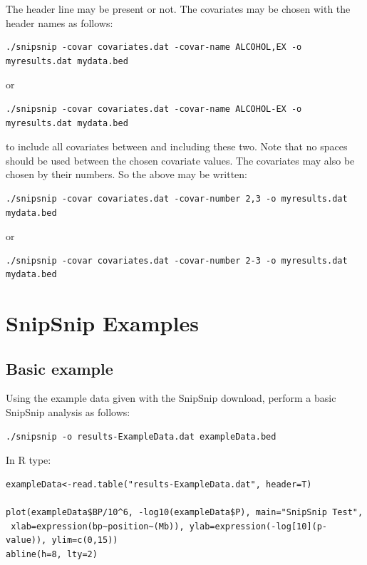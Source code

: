 \documentclass[a4paper,12pt]{article}
\begin{document}
The header line may be present or not. The covariates may be chosen with the header names as follows: 
\begin{verbatim}
./snipsnip -covar covariates.dat -covar-name ALCOHOL,EX -o myresults.dat mydata.bed
\end{verbatim}

or 
\begin{verbatim}
./snipsnip -covar covariates.dat -covar-name ALCOHOL-EX -o myresults.dat mydata.bed
\end{verbatim}

to include all covariates between and including these two. Note that no spaces should be used between the chosen covariate values. The covariates may also be chosen by their numbers. So the above may be written: 
\begin{verbatim}
./snipsnip -covar covariates.dat -covar-number 2,3 -o myresults.dat mydata.bed
\end{verbatim}

or 
\begin{verbatim}
./snipsnip -covar covariates.dat -covar-number 2-3 -o myresults.dat mydata.bed
\end{verbatim}


\section{SnipSnip Examples}
\label{example}
\subsection{Basic example}
\label{ex-basic}

Using the example data given with the SnipSnip download, perform a basic SnipSnip analysis as follows: 
\begin{verbatim}
./snipsnip -o results-ExampleData.dat exampleData.bed
\end{verbatim}

In R type: 
\begin{verbatim}
exampleData<-read.table("results-ExampleData.dat", header=T)

plot(exampleData$BP/10^6, -log10(exampleData$P), main="SnipSnip Test",
 xlab=expression(bp~position~(Mb)), ylab=expression(-log[10](p-value)), ylim=c(0,15)) 
abline(h=8, lty=2)
\end{verbatim}
\end{document}
